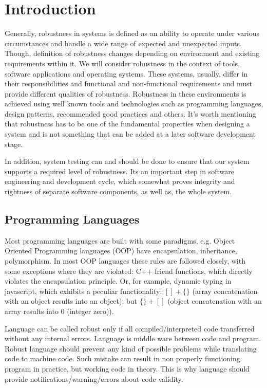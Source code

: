 \section{Introduction}
  
  Generally, robustness in systems is defined as an ability to operate under various circumstances and handle a wide range of expected and unexpected inputs. Though, definition of robustness changes depending on environment and existing requirements within it. We will consider robustness in the context of tools, software applications and operating systems. These systems, usually, differ in their responsibilities and functional and non-functional requirements and must provide different qualities of robustness. Robustness in these environments is achieved using well known tools and technologies such as programming languages, design patterns, recommended good practices and others. It's worth mentioning that robustness has to be one of the fundamental properties when designing a system and is not something that can be added at a later software development stage.

  In addition, system testing can and should be done to ensure that our system supports a required level of robustness. Its an important step in software engineering and development cycle, which somewhat proves integrity and rightness of separate software components, as well as, the whole system.


\subsection{Programming Languages}

  Most programming languages are built with some paradigms, e.g. Object Oriented Programming languages (OOP) have encapsulation, inheritance, polymorphism. In most OOP languages these rules are followed closely, with some exceptions where they are violated: C++ friend functions, which directly violates the encapsulation principle. Or, for example, dynamic typing in javascript, which exhibits a peculiar functionality: $[]+\{\}$ (array concatenation with an object results into an object), but $\{\}+[]$ (object concatenation with an array results into 0 (integer zero))\cite{hagen2007architectural}.

  Language can be called robust only if all compiled/interpreted code transferred without any internal errors. Language is middle ware between code and program. Robust language should prevent any kind of possible problems while translating code to machine code. Such mistake can result in non properly functioning program in practice, but working code in theory. This is why language should provide notifications/warning/errors about code validity.

